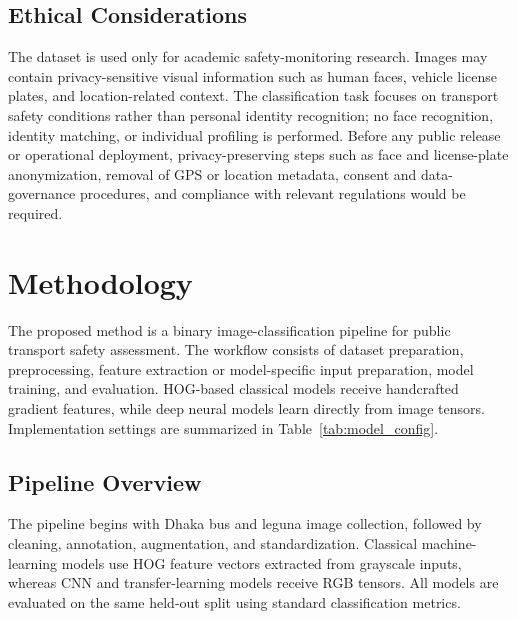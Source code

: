 \documentclass[conference]{IEEEtran}
\begin{document}
\subsection{Ethical Considerations}
The dataset is used only for academic safety-monitoring research. Images may contain privacy-sensitive visual information such as human faces, vehicle license plates, and location-related context. The classification task focuses on transport safety conditions rather than personal identity recognition; no face recognition, identity matching, or individual profiling is performed. Before any public release or operational deployment, privacy-preserving steps such as face and license-plate anonymization, removal of GPS or location metadata, consent and data-governance procedures, and compliance with relevant regulations would be required.

\section{Methodology}
The proposed method is a binary image-classification pipeline for public transport safety assessment. The workflow consists of dataset preparation, preprocessing, feature extraction or model-specific input preparation, model training, and evaluation. HOG-based classical models receive handcrafted gradient features, while deep neural models learn directly from image tensors. Implementation settings are summarized in Table~\ref{tab:model_config}.

\subsection{Pipeline Overview}
The pipeline begins with Dhaka bus and leguna image collection, followed by cleaning, annotation, augmentation, and standardization. Classical machine-learning models use HOG feature vectors extracted from grayscale inputs, whereas CNN and transfer-learning models receive RGB tensors. All models are evaluated on the same held-out split using standard classification metrics.
\end{document}
